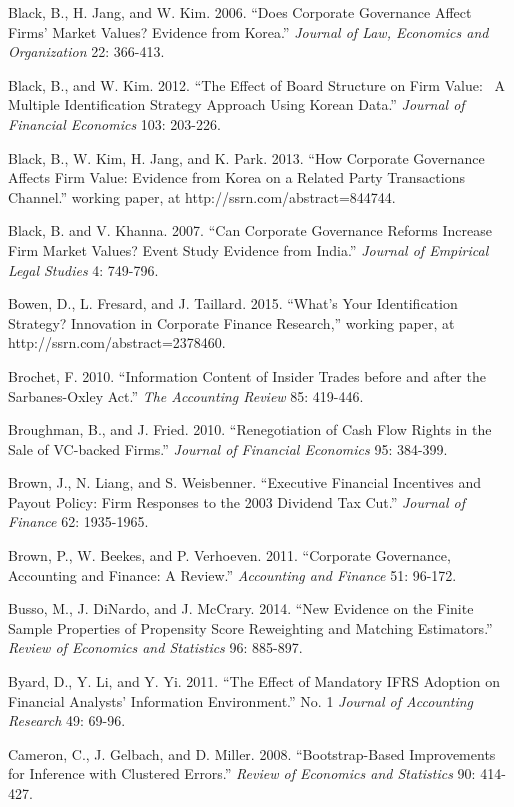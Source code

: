 \noindent Black, B., H. Jang, and W. Kim. 2006. ``Does Corporate Governance Affect Firms' Market Values?  Evidence from Korea.''  \textit{Journal of Law, Economics and Organization} 22: 366-413.

\noindent Black, B., and W. Kim. 2012. ``The Effect of Board Structure on Firm Value:~ A Multiple Identification Strategy Approach Using Korean Data.''  \textit{Journal of Financial Economics }103: 203-226.

\noindent Black, B., W. Kim, H. Jang, and K. Park. 2013. ``How Corporate Governance Affects Firm Value:  Evidence from Korea on a Related Party Transactions Channel.'' working paper, at http://ssrn.com/abstract=844744.

\noindent Black, B. and V. Khanna. 2007. ``Can Corporate Governance Reforms Increase Firm Market Values? Event Study Evidence from India.''  \textit{Journal of Empirical Legal Studies} 4: 749-796.

\noindent Bowen, D., L. Fresard, and J. Taillard. 2015. ``What's Your Identification Strategy?  Innovation in Corporate Finance Research,'' working paper, at http://ssrn.com/abstract=2378460. 

\noindent Brochet, F. 2010. ``Information Content of Insider Trades before and after the Sarbanes-Oxley Act.''  \textit{The Accounting Review} 85: 419-446. 

\noindent Broughman, B., and J. Fried. 2010. ``Renegotiation of Cash Flow Rights in the Sale of VC-backed Firms.''  \textit{Journal of Financial Economics} 95: 384-399.

\noindent Brown, J., N. Liang, and S. Weisbenner. ``Executive Financial Incentives and Payout Policy: Firm Responses to the 2003 Dividend Tax Cut.''  \textit{Journal of Finance} 62: 1935-1965.

\noindent Brown, P., W. Beekes, and P. Verhoeven. 2011. ``Corporate Governance, Accounting and Finance:  A Review.''  \textit{Accounting and Finance} 51: 96-172.

\noindent Busso, M., J. DiNardo, and J. McCrary. 2014. ``New Evidence on the Finite Sample Properties of Propensity Score Reweighting and Matching Estimators.'' \textit{Review of Economics and Statistics }96:  885-897.

\noindent Byard, D., Y. Li, and Y. Yi. 2011. ``The Effect of Mandatory IFRS Adoption on Financial Analysts' Information Environment.''  No. 1 \textit{Journal of Accounting Research }49: 69-96.

\noindent Cameron, C., J. Gelbach, and D. Miller. 2008. ``Bootstrap-Based Improvements for Inference with Clustered Errors.''  \textit{Review of Economics and Statistics} 90: 414-427.

